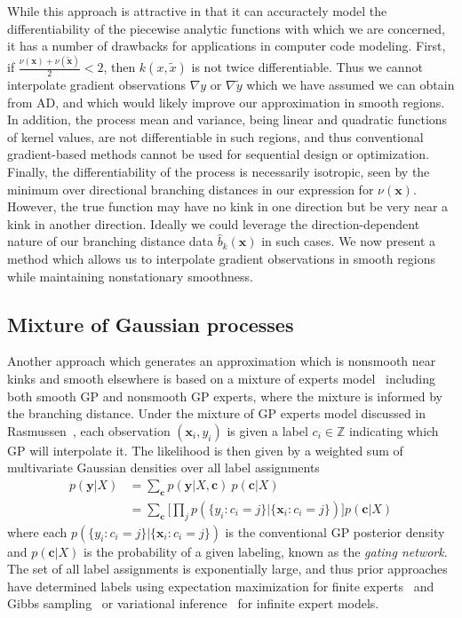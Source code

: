 \documentclass{article}
\renewcommand{\vec}[1]{\mathbf{#1}}
\newcommand{\Z}{\mathbb{Z}}
\numberwithin{equation}{section}
\begin{document}
While this approach is attractive in that it can accuractely model the differentiability of the piecewise analytic functions with which we are concerned, it has a number of drawbacks for applications in computer code modeling. First, if $\frac{\nu(\vec{x}) + \nu(\tilde{\vec{x}})}{2} < 2$, then $k(x, \tilde{x})$ is not twice differentiable. Thus we cannot interpolate gradient observations $\nabla y$ or $\nabla \tilde{y}$ which we have assumed we can obtain from AD, and which would likely improve our approximation in smooth regions. In addition, the process mean and variance, being linear and quadratic functions of kernel values, are not differentiable in such regions, and thus conventional gradient-based methods cannot be used for sequential design or optimization. Finally, the differentiability of the process is necessarily isotropic, seen by the minimum over directional branching distances in our expression for $\nu(\vec{x})$. However, the true function may have no kink in one direction but be very near a kink in another direction. Ideally we could leverage the direction-dependent nature of our branching distance data $\hat{b}_k(\vec{x})$ in such cases. We now present a method which allows us to interpolate gradient observations in smooth regions while maintaining nonstationary smoothness.

\subsection{Mixture of Gaussian processes}
Another approach which generates an approximation which is nonsmooth near kinks and smooth elsewhere is based on a mixture of experts model~\cite{jacobs1991adaptive} including both smooth GP and nonsmooth GP experts, where the mixture is informed by the branching distance. Under the mixture of GP experts model discussed in Rasmussen~\cite{rasmussen2002infinite}, each observation $(\vec{x}_i, y_i)$ is given a label $c_i \in \Z$ indicating which GP will interpolate it. The likelihood is then given by a weighted sum of multivariate Gaussian densities over all label assignments
\begin{align*}
  p(\vec{y} | X) & = \sum_\vec{c} p(\vec{y} | X, \vec{c}) \ p(\vec{c} | X) \\
  & = \sum_\vec{c} \bigg[ \prod_{j} p(\{y_i : c_i = j \} | \{\vec{x}_i : c_i = j \}) \bigg] p(\vec{c} | X)
\end{align*}
where each $p(\{y_i : c_i = j \} | \{\vec{x}_i : c_i = j \})$ is the conventional GP posterior density and $p(\vec{c} | X)$ is the probability of a given labeling, known as the \textit{gating network}. The set of all label assignments is exponentially large, and thus prior approaches have determined labels using expectation maximization for finite experts~\cite{tresp2001mixtures} and Gibbs sampling~\cite{meeds2006alternative} or variational inference~\cite{yuan2009variational} for infinite expert models.
\end{document}
